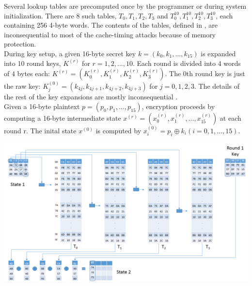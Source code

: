 \documentclass[3p]{elsarticle}
\begin{document}
Several lookup tables are precomputed once by the programmer or during system initialization. There are 8 such tables, $T_0,T_1,T_2,T_3$ and $T_0^{10},T_1^{10},T_2^{10},T_3^{10}$, each containing 256 4-byte words. The contents of the tables, defined in \citep{daemen2002design}, are inconsequential to most of the cache-timing attacks because of memory protection.\\

During key setup, a given 16-byte secret key $k=(k_0,k_1,...,k_{15})$ is expanded into 10 round keys, $K^{(r)}$ for $r=1,2,...,10$. Each round is divided into 4 words of 4 bytes each: $K^{(r)}=(K_0^{(r)},K_1^{(r)},K_2^{(r)},K_3^{(r)})$. The 0th round key is just the raw key: $K_j^{(0)}=(k_{4j},k_{4j+1},k_{4j+2},k_{4j+3})$ for $j=0,1,2,3$. The details of the rest of the key expansions are mostly inconsequential \citep{osvik}.\\

Given a 16-byte plaintext $p=(p_0,p_1,...,p_{15})$, encryption proceeds by computing a 16-byte intermediate state $x^{(r)}=(x_0^{(r)},x_1^{(r)},...,x_{15}^{(r)})$ at each round r. The inital state $x^{(0)}$ is computed by $x_i^{(0)}=p_i \oplus k_i ( i=0,1,...,15 )$.

\begin{center}
\includegraphics[scale=0.4,natwidth=1159,natheight=661]{Figures/aes-1-1(new).png}
\label{fig: The diagram shows how $x_0^1,x_1^1,x_2^1,x_3^1$ are computed.}
\end{center}
\end{document}
